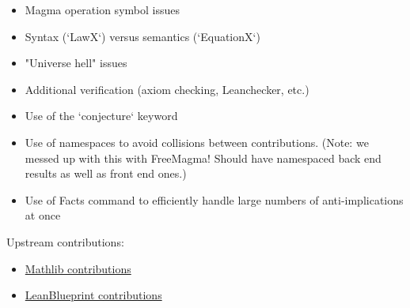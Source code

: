 \begin{itemize}
    \item Magma operation symbol issues
    \item Syntax (`LawX`) versus semantics (`EquationX`)
    \item "Universe hell" issues
    \item Additional verification (axiom checking, Leanchecker, etc.)
    \item Use of the `conjecture` keyword
    \item Use of namespaces to avoid collisions between contributions. (Note: we messed up with this with FreeMagma! Should have namespaced back end results as well as front end ones.)
    \item Use of Facts command to efficiently handle large numbers of anti-implications at once
\end{itemize}

Upstream contributions:

\begin{itemize}
    \item \href{https://github.com/leanprover-community/mathlib4/pulls?q=is%3Apr+is%3Abody+EquationalTheories+}{Mathlib contributions}
    \item \href{https://github.com/PatrickMassot/leanblueprint/pulls?q=is%3Apr+in%3Abody+EquationalTheories+}{LeanBlueprint contributions}
\end{itemize}

